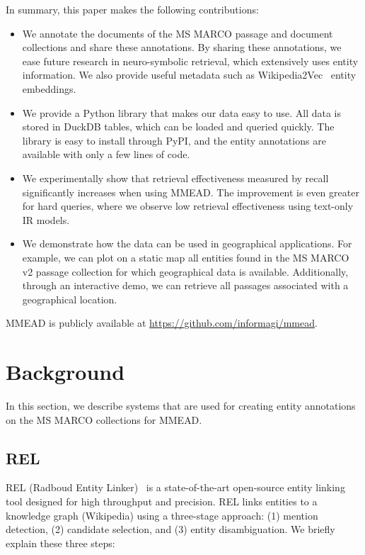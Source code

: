 In summary, this paper makes the following contributions:
 \begin{itemize}
	\item We annotate the documents of the MS MARCO passage and document collections and share these annotations. By sharing these annotations, we ease future research in neuro-symbolic retrieval, which extensively uses entity information. We also provide useful metadata such as Wikipedia2Vec~\citep{wikipedia2vec} entity embeddings. 
	\item We provide a Python library that makes our data easy to use. All data is stored in DuckDB tables, which can be loaded and queried quickly. The library is easy to install through PyPI, and the entity annotations are available with only a few lines of code.
	\item We experimentally show that retrieval effectiveness measured by recall significantly increases when using MMEAD. The improvement is even greater for hard queries, where we observe low retrieval effectiveness using text-only IR models.
	\item We demonstrate how the data can be used in geographical applications. For example, we can plot on a static map all entities found in the MS MARCO v2 passage collection for which geographical data is available. Additionally, through an interactive demo, we can retrieve all passages associated with a geographical location.  
\end{itemize}

MMEAD is publicly available at \url{https://github.com/informagi/mmead}.

\section{Background}
In this section, we describe systems that are used for creating entity annotations on the MS MARCO collections for MMEAD.  

\subsection{REL}
REL (Radboud Entity Linker)~\citep{rel} is a state-of-the-art open-source entity linking tool designed for high throughput and precision. REL links entities to a knowledge graph (Wikipedia) using a three-stage approach: (1) mention detection, (2) candidate selection, and (3) entity disambiguation. We briefly explain these three steps:

